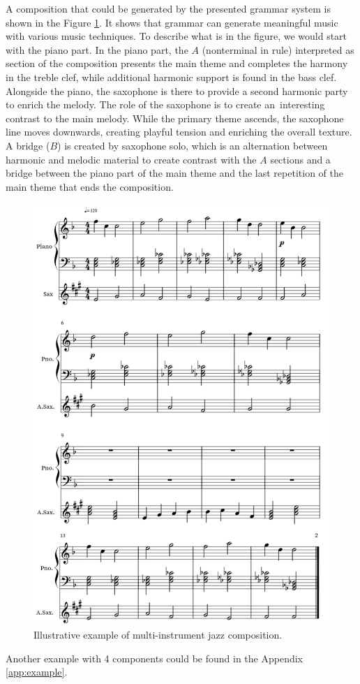 A composition that could be generated by the presented grammar system is shown in the Figure \ref{fig:JazzExamples}. It shows that grammar can generate meaningful music with various music techniques. To describe what is in the figure, we would start with the piano part. In the piano part, the $A$ (nonterminal in rule) interpreted as section of the composition presents the main theme and completes the harmony in the treble clef, while additional harmonic support is found in the bass clef. Alongside the piano, the saxophone is there to provide a second harmonic party to enrich the melody. The role of the saxophone is to create an~interesting contrast to the main melody. While the primary theme ascends, the saxophone line moves downwards, creating playful tension and enriching the overall texture. A bridge ($B$) is created by saxophone solo, which is an alternation between harmonic and melodic material to create contrast with the $A$ sections and a bridge between the piano part of the main theme and the last repetition of the main theme that ends the composition. 
\begin{figure}[H]
\centering
\includegraphics[scale=0.5]{obrazky-figures/Example-Jazz/Fullmusicexample.pdf}
\caption{Illustrative example of multi-instrument jazz composition.}
\label{fig:JazzExamples}
\end{figure}
Another example with 4 components could be found in the Appendix \ref{app:example}.

